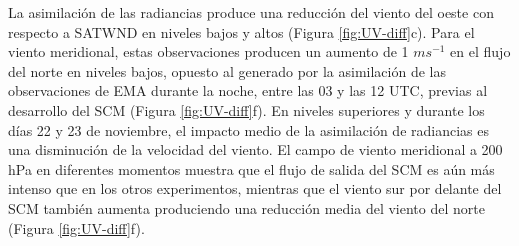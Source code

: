 \documentclass[12pt,oneside,a4paper]{reedthesis}
\begin{document}
La asimilación de las radiancias produce una reducción del viento del oeste con respecto a SATWND en niveles bajos y altos (Figura \ref{fig:UV-diff}c). Para el viento meridional, estas observaciones producen un aumento de 1 \(ms^{-1}\) en el flujo del norte en niveles bajos, opuesto al generado por la asimilación de las observaciones de EMA durante la noche, entre las 03 y las 12 UTC, previas al desarrollo del SCM (Figura \ref{fig:UV-diff}f). En niveles superiores y durante los días 22 y 23 de noviembre, el impacto medio de la asimilación de radiancias es una disminución de la velocidad del viento. El campo de viento meridional a 200 hPa en diferentes momentos muestra que el flujo de salida del SCM es aún más intenso que en los otros experimentos, mientras que el viento sur por delante del SCM también aumenta produciendo una reducción media del viento del norte (Figura \ref{fig:UV-diff}f).
\end{document}
